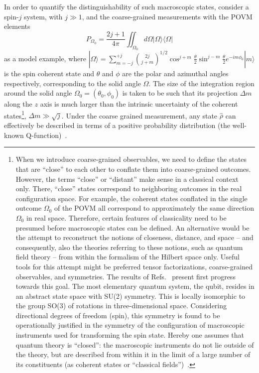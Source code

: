 \documentclass[12pt]{article}
\begin{document}
In order to quantify the distinguishability of such macroscopic states, consider a spin-$j$ system, with $ j \gg 1$, and the coarse-grained measurements with the POVM elements
\begin{equation}
P_{\Omega_0}=\frac{2j+1}{4\pi} \iint_{\Omega_0} d\Omega |\Omega\rangle \langle \Omega|
\end{equation}
as a model example, where $|\Omega\rangle= \sum_{m=-j}^{+j} {2j \choose j+m}^{1/2} \cos^{j+m}\frac{\theta}{2} \sin^{j-m}\frac{\theta}{2} e^{-im\phi_0} |m\rangle $ is the spin coherent state and $\theta$ and $\phi$ are the polar and azimuthal angles respectively, corresponding to the solid angle $\Omega$. The size of the integration region around the solid angle $\Omega_0=(\theta_0, \phi_0)$ is taken to be such that its projection $\Delta m$ along the $z$ axis is much larger than the intrinsic uncertainty of the coherent states\footnote{When we introduce coarse-grained observables, we need to define the states that are ``close'' to each other to conflate them into coarse-grained outcomes. However, the terms ``close'' or ``distant'' make sense in a classical context only. There, ``close'' states correspond to neighboring outcomes in the real configuration space. For example, the coherent states conflated in the single outcome $\Omega_0$ of the POVM all correspond to approximately the same direction $\Omega_0$ in real space. Therefore, certain features of classicality need to be presumed before macroscopic states can be defined. An alternative would be the attempt to reconstruct the notions of closeness, distance, and space -- and consequently, also the theories referring to these notions, such as quantum field theory -- from within the formalism of the Hilbert space only. Useful tools for this attempt might be preferred tensor factorizations, coarse-grained observables, and symmetries. The results of Refs.~\cite{mueller,dakic} present first progress towards this goal. The most elementary quantum system, the qubit, resides in an abstract state space with SU(2) symmetry. This is locally isomorphic to the group SO(3) of rotations in three-dimensional space. Considering  directional degrees of freedom (spin), this symmetry is found to be operationally justified in the symmetry of the configuration of macroscopic instruments used for transforming the spin state. Hereby one assumes that quantum theory is ``closed'': the macroscopic instruments do not lie outside of the theory, but are described from within it in the limit of a large number of its constituents (as coherent states or ``classical fields'')~\cite{dakic}.}, $\Delta m \gg \sqrt{j}$. Under the coarse grained measurement, any state $\hat{\rho}$ can effectively be described in terms of a positive probability distribution (the well-known Q-function)~\cite{kofler}.
\end{document}
